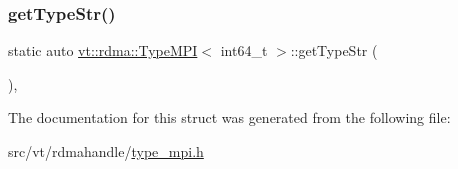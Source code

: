 \mbox{\label{structvt_1_1rdma_1_1_type_m_p_i_3_01int64__t_01_4_a583db77fd0a96e5db4a390af1d7ba7a0}} 
\subsubsection{\texorpdfstring{get\+Type\+Str()}{getTypeStr()}}
{\footnotesize\ttfamily static auto \hyperlink{structvt_1_1rdma_1_1_type_m_p_i}{vt\+::rdma\+::\+Type\+M\+PI}$<$ int64\+\_\+t $>$\+::get\+Type\+Str (\begin{DoxyParamCaption}{ }\end{DoxyParamCaption})\hspace{0.3cm}{\ttfamily [inline]}, {\ttfamily [static]}}



The documentation for this struct was generated from the following file\+:\begin{DoxyCompactItemize}
\item 
src/vt/rdmahandle/\hyperlink{type__mpi_8h}{type\+\_\+mpi.\+h}\end{DoxyCompactItemize}
